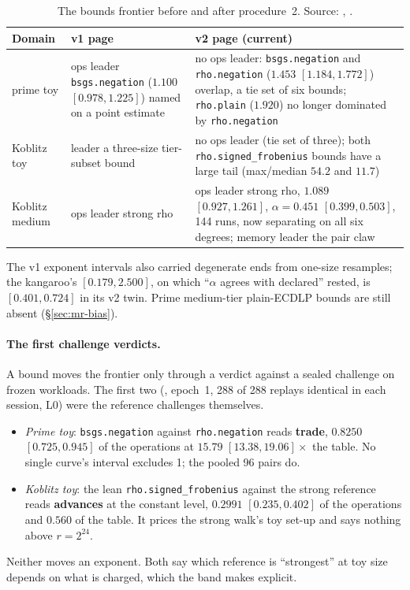 \begin{table}[t]
\centering\small
\begin{tabularx}{\linewidth}{@{}l>{\raggedright}X>{\raggedright\arraybackslash}X@{}}
\toprule
Domain & v1 page & v2 page (current) \\
\midrule
prime toy & ops leader \texttt{bsgs.negation} ($1.100$ $[0.978,1.225]$) named on a point estimate & no ops leader: \texttt{bsgs.negation} and \texttt{rho.negation} ($1.453$ $[1.184,1.772]$) overlap, a tie set of six bounds; \texttt{rho.plain} ($1.920$) no longer dominated by \texttt{rho.negation} \\
Koblitz toy & leader a three-size tier-subset bound & no ops leader (tie set of three); both \texttt{rho.signed\_frobenius} bounds have a large tail (max/median $54.2$ and $11.7$) \\
Koblitz medium & ops leader strong rho & ops leader strong rho, $1.089$ $[0.927,1.261]$, $\alpha=0.451$ $[0.399,0.503]$, 144 runs, now separating on all six degrees; memory leader the pair claw \\
\bottomrule
\end{tabularx}
\caption[]{The bounds frontier before and after procedure~2. Source:
,
.}
\label{tab:mr-frontier}
\end{table}

The v1 exponent intervals also carried degenerate ends from one-size
resamples; the kangaroo's $[0.179,2.500]$, on which ``$\alpha$ agrees with
declared'' rested, is $[0.401,0.724]$ in its v2 twin. Prime medium-tier
plain-ECDLP bounds are still absent (\S\ref{sec:mr-bias}).

\paragraph{The first challenge verdicts.} A bound moves the frontier only
through a verdict against a sealed challenge on frozen workloads. The first
two (, epoch~1, 288 of
288 replays identical in each session, L0) were the reference challenges
themselves.
\begin{itemize}
\item \emph{Prime toy}: \texttt{bsgs.negation} against \texttt{rho.negation}
  reads \textbf{trade}, $0.8250$ $[0.725,0.945]$ of the operations at
  $15.79$ $[13.38,19.06]\times$ the table. No single curve's interval
  excludes 1; the pooled 96 pairs do.
\item \emph{Koblitz toy}: the lean \texttt{rho.signed\_frobenius} against the
  strong reference reads \textbf{advances} at the constant level, $0.2991$
  $[0.235,0.402]$ of the operations and $0.560$ of the table. It prices the
  strong walk's toy set-up and says nothing above $r=2^{24}$.
\end{itemize}
Neither moves an exponent. Both say which reference is ``strongest'' at
toy size depends on what is charged, which the band makes explicit.

